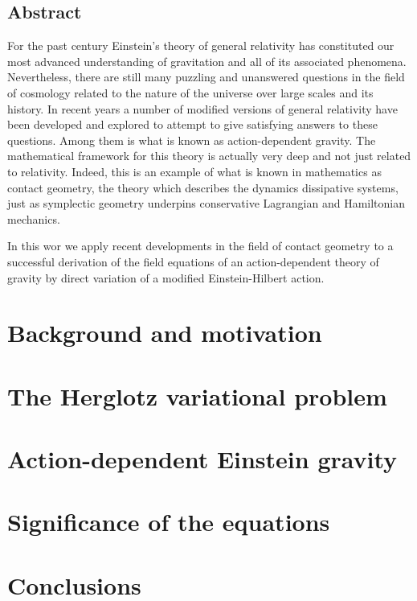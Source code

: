 \documentclass[12pt, oneside]{book}
\begin{document}
\pagebreak
\section*{Abstract}
For the past century Einstein's theory of general relativity has constituted our most
advanced understanding of gravitation and all of its associated phenomena. Nevertheless,
there are still many puzzling and unanswered questions in the field of cosmology related
to the nature of the universe over large scales and its history. In recent years a number
of modified versions of general relativity have been developed and explored to attempt to
give satisfying answers to these questions. Among them is what is known as
action-dependent gravity. The mathematical framework for this theory is actually very deep
and not just related to relativity. Indeed, this is an example of what is known in
mathematics as contact geometry, the theory which describes the dynamics dissipative
systems, just as symplectic geometry underpins conservative Lagrangian and Hamiltonian
mechanics.

In this wor we apply recent developments in the field of contact geometry to a
successful derivation of the field equations of an action-dependent theory of gravity by
direct variation of a modified Einstein-Hilbert action. 

	{\small \sffamily \tableofcontents}

\mainmatter
\pagestyle{main}

\chapter{Background and motivation}


\chapter{The Herglotz variational problem}\label{ch:herglotz}


\chapter{Action-dependent Einstein gravity}\label{ch:einstein}


\chapter{Significance of the equations}\label{ch:significance}


\chapter{Conclusions}\label{ch:conclusions}


\backmatter

\pagestyle{plain}
\printbibliography
\end{document}
